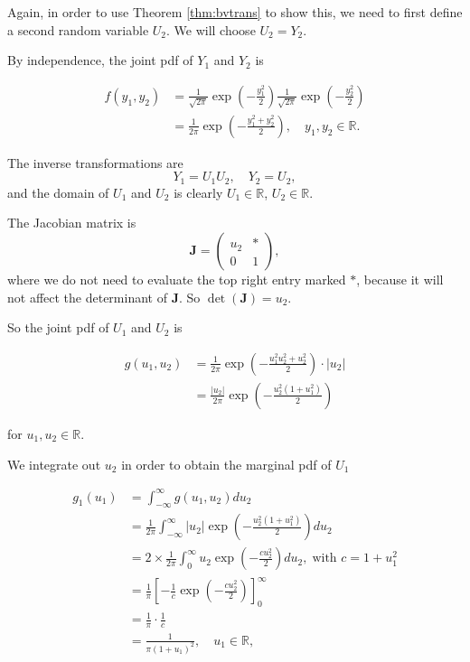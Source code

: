 \documentclass[]{book}
\theoremstyle{definition}
\theoremstyle{definition}
\theoremstyle{definition}
\theoremstyle{remark}
\begin{document}
\iffalse{} {Proof. } \fi{}Again, in order to use Theorem
\ref{thm:bvtrans} to show this, we need to first define a second random
variable \(U_2\). We will choose \(U_2 = Y_2\).

By independence, the joint pdf of \(Y_1\) and \(Y_2\) is

\begin{align*}
f(y_1, y_2) &= \frac{1}{\sqrt{2 \pi}} \exp\left(-\frac{y_1^2}{2}\right)
  \frac{1}{\sqrt{2 \pi}} \exp\left(-\frac{y_2^2}{2}\right) \\
  &= \frac{1}{2 \pi} \exp \left(-\frac{y_1^2 + y_2^2}{2} \right),
  \quad y_1, y_2 \in \mathbb{R}.
\end{align*}

The inverse transformations are \[Y_1 = U_1 U_2, \quad Y_2 = U_2,\] and
the domain of \(U_1\) and \(U_2\) is clearly \(U_1 \in \mathbb{R}\),
\(U_2 \in \mathbb{R}\).

The Jacobian matrix is \[\bm J = \begin{pmatrix}
  u_2 & * \\
  0 & 1
  \end{pmatrix},\] where we do not need to evaluate the top right entry
marked \(*\), because it will not affect the determinant of \(\bm J\).
So \(\det(\bm J) = u_2\).

So the joint pdf of \(U_1\) and \(U_2\) is

\begin{align*}
g(u_1, u_2) &= \frac{1}{2 \pi} \exp \left(-\frac{u_1^2 u_2^2 + u_2^2}{2} \right) 
\cdot |u_2| \\
&= \frac{|u_2|}{2 \pi} \exp \left(-\frac{u_2^2(1 + u_1^2)}{2} \right) 
\end{align*}

for \(u_1, u_2 \in \mathbb{R}\).

We integrate out \(u_2\) in order to obtain the marginal pdf of \(U_1\)

\begin{align*}
g_1(u_1) &= \int_{-\infty}^\infty g(u_1, u_2) du_2 \\
&= \frac{1}{2 \pi}  \int_{-\infty}^\infty |u_2| \exp \left(-\frac{u_2^2(1 + u_1^2)}{2} \right)  du_2 \\
&= 2 \times \frac{1}{2 \pi} 
\int_{0}^\infty u_2 \exp \left(-\frac{c u_2^2}{2} \right)  du_2,  \; \text{with $c = 1 + u_1^2$} \\
&= \frac{1}{\pi} \left[-\frac{1}{c} \exp\left(-\frac{c u_2^2}{2}\right)\right]_0^\infty \\
&= \frac{1}{\pi} \cdot \frac{1}{c} \\
&= \frac{1}{\pi (1 + u_1)^2}, \quad u_1 \in \mathbb{R},
\end{align*}
\end{document}

